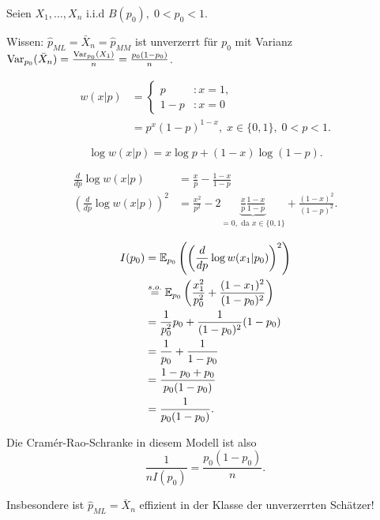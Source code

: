 \documentclass{tstextbook}
\begin{document}
\begin{example}
	Seien $ X_1,\ldots,X_n $ i.i.d $ B(p_0), \; 0<p_0<1 $. 
	
	Wissen: $ \hat{p}_{ML} = \bar{X}_n = \hat{p}_{MM} $ ist unverzerrt für $ p_0 $ mit Varianz $ \operatorname{Var}_{p_0}(\bar{X}_n) = \frac{\operatorname{Var}_{p_0}(X_1)}{n} = \frac{p_0(1-p_0)}{n} $. 
	
	\[
	\begin{aligned}
		w(x|p) & =\left\{\begin{array}{ll}
			p & \colon x=1, \\
			1-p & \colon x=0 \end{array}\right .\\
		& = p^x(1-p)^{1-x}, \; x\in\lbrace0,1\rbrace, \; 0<p<1.
	\end{aligned}
	\]
	
	\[
	\log w(x|p) = x\log p + (1-x)\log(1-p).
	\]
	
	\[\begin{aligned}
	\frac{d}{dp}\log w(x|p) & = \frac{x}{p} - \frac{1-x}{1-p} \\
	\left(\frac{d}{dp}\log w(x|p)\right)^2 & = \frac{x^2}{p^2} - 2\underbrace{\frac{x}{p}\frac{1-x}{1-p}}_{=0, \text{ da } x\in\lbrace0,1\rbrace} + \frac{(1-x)^2}{(1-p)^2}.
	\end{aligned}
	\]
	
	\[
	\begin{aligned}
		I(p_0) & = \mathbb E_{p_0} \left(\left(\frac{d}{dp}\log w(x_1|p_0)\right)^2\right) \\
		& \overset{s.o.}{=} \mathbb E_{p_0} \left(\frac{x_1^2}{p_0^2} + \frac{(1-x_1)^2}{(1-p_0)^2}\right)\\
		& = \frac{1}{p_0^2}p_0 +\frac{1}{(1-p_0)^2}(1-p_0) \\
		& = \frac{1}{p_0} + \frac{1}{1-p_0} \\
		& = \frac{1-p_0+p_0}{p_0(1-p_0)} \\
		& = \frac{1}{p_0(1-p_0)}.
	\end{aligned}
	\]
	
	Die Cramér-Rao-Schranke in diesem Modell ist also 
	\[
	\frac{1}{nI(p_0)} = \frac{p_0(1-p_0)}{n}.
	\]
	
	Insbesondere ist $ \hat{p}_{ML} = \bar{X}_n $ effizient in der Klasse der unverzerrten Schätzer!
\end{example}
\end{document}
